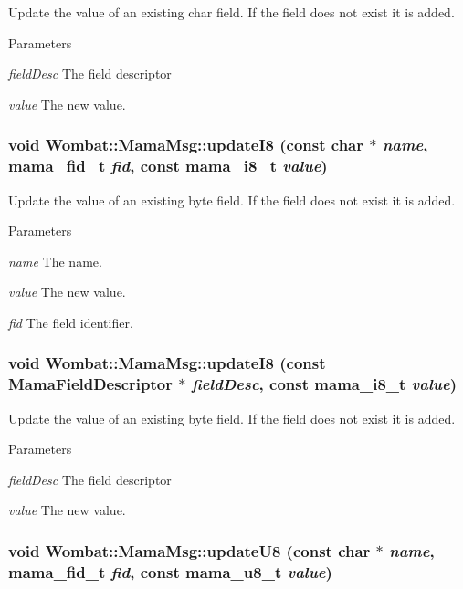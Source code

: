 Update the value of an existing char field. If the field does not exist it is added.


\begin{DoxyParams}{Parameters}
\item[{\em fieldDesc}]The field descriptor \item[{\em value}]The new value. \end{DoxyParams}
\hypertarget{classWombat_1_1MamaMsg_a0b460f0e13b9a4e1eff7144f79b44d09}{
\subsubsection[{updateI8}]{\setlength{\rightskip}{0pt plus 5cm}void Wombat::MamaMsg::updateI8 (const char $\ast$ {\em name}, \/  mama\_\-fid\_\-t {\em fid}, \/  const mama\_\-i8\_\-t {\em value})}}
\label{classWombat_1_1MamaMsg_a0b460f0e13b9a4e1eff7144f79b44d09}


Update the value of an existing byte field. If the field does not exist it is added.


\begin{DoxyParams}{Parameters}
\item[{\em name}]The name. \item[{\em value}]The new value. \item[{\em fid}]The field identifier. \end{DoxyParams}
\hypertarget{classWombat_1_1MamaMsg_ac23834437373d7784614f0493327b27c}{
\subsubsection[{updateI8}]{\setlength{\rightskip}{0pt plus 5cm}void Wombat::MamaMsg::updateI8 (const {\bf MamaFieldDescriptor} $\ast$ {\em fieldDesc}, \/  const mama\_\-i8\_\-t {\em value})}}
\label{classWombat_1_1MamaMsg_ac23834437373d7784614f0493327b27c}


Update the value of an existing byte field. If the field does not exist it is added.


\begin{DoxyParams}{Parameters}
\item[{\em fieldDesc}]The field descriptor \item[{\em value}]The new value. \end{DoxyParams}
\hypertarget{classWombat_1_1MamaMsg_ac8c7b1099e92b2dded67b7996088cf56}{
\subsubsection[{updateU8}]{\setlength{\rightskip}{0pt plus 5cm}void Wombat::MamaMsg::updateU8 (const char $\ast$ {\em name}, \/  mama\_\-fid\_\-t {\em fid}, \/  const mama\_\-u8\_\-t {\em value})}}
\label{classWombat_1_1MamaMsg_ac8c7b1099e92b2dded67b7996088cf56}


